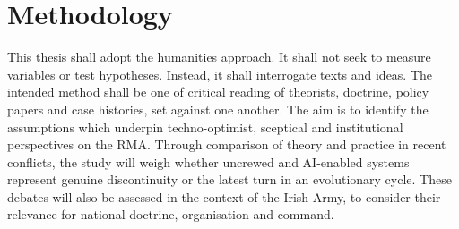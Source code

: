 \chapter{Methodology}

This thesis shall adopt the humanities approach. It shall not seek to measure variables or test hypotheses. Instead, it shall interrogate texts and ideas. The intended method shall be one of critical reading of theorists, doctrine, policy papers and case histories, set against one another. The aim is to identify the assumptions which underpin techno-optimist, sceptical and institutional perspectives on the RMA. Through comparison of theory and practice in recent conflicts, the study will weigh whether uncrewed and AI-enabled systems represent genuine discontinuity or the latest turn in an evolutionary cycle. These debates will also be assessed in the context of the Irish Army, to consider their relevance for national doctrine, organisation and command.